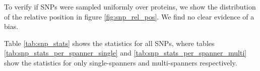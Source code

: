 
To verify if SNPs were sampled uniformly
over proteins, we show the distribution 
of the relative position in figure \ref{fig:snp_rel_pos}.
We find no clear evidence of a bias.


Table \ref{tab:snp_stats} shows the statistics for all
SNPs, where tables \ref{tab:snp_stats_per_spanner_single}
and \ref{tab:snp_stats_per_spanner_multi} show the
statistics for only single-spanners and multi-spanners respectively.
 






%
%





